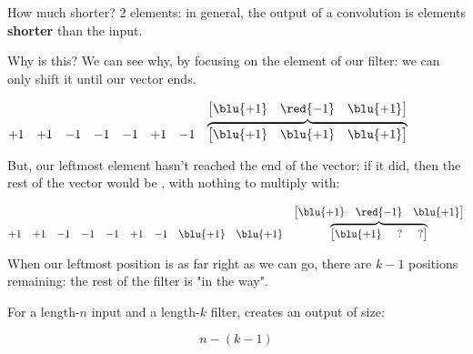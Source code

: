         How much shorter? 2 elements: in general, the output of a convolution is  elements \textbf{shorter} than the input.

        Why is this? We can see why, by focusing on the  element of our filter: we can only shift it until our vector ends.


        \begin{equation}
              \begin{matrix}
                  +1&+1&-1&-1&-1&
                  +1&-1&
                  \overbrace{
                  \begin{bmatrix}
                      \blu{+1}&\blu{+1}&\blu{+1}
                  \end{bmatrix} 
                  }^{\begin{bmatrix}
                      \blu{+1} & \red{-1} & \blu{+1}
                  \end{bmatrix}}
                  &\phantom{+1}&\phantom{+1}
              \end{matrix}
        \end{equation}

        But, our leftmost element hasn't reached the end of the vector: if it did, then the rest of the vector would be , with nothing to multiply with:

        \begin{equation}
              \begin{matrix}
                  +1&+1&-1&-1&-1&
                  +1&-1&\blu{+1}&\blu{+1}&
                  \overbrace{
                  \begin{bmatrix}
                      \blu{+1} & \phantom{?}? & \phantom{?}?
                  \end{bmatrix} 
                  }^{\begin{bmatrix}
                      \blu{+1} & \red{-1} & \blu{+1}
                  \end{bmatrix}}
              \end{matrix}
        \end{equation}

        When our leftmost position is as far right as we can go, there are $k-1$ positions remaining: the rest of the filter is "in the way".\\

        \begin{concept}
            For a length-$n$ input and a length-$k$ filter,  creates an output of size:

            \begin{equation*}
                n - (k-1)
            \end{equation*}
        \end{concept}

